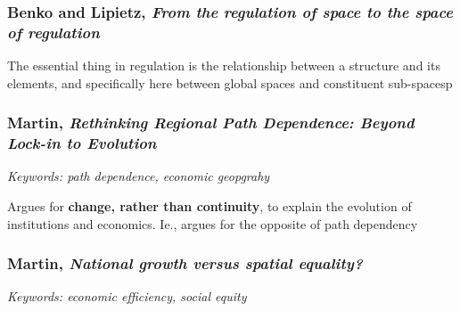 \documentclass{article}
\begin{document}
\subsubsection{Benko and Lipietz, \textit{From the regulation of space to the space of regulation}}

\begin{outline}
	\1 The essential thing in regulation is the relationship between a structure and its elements, and specifically here between global spaces and constituent sub-spacesp
\end{outline}

\subsubsection{Martin, \textit{Rethinking Regional Path Dependence: Beyond Lock-in to Evolution}}

\textit{Keywords: path dependence, economic geopgrahy}

\begin{outline}
	\1 Argues for \textbf{change, rather than continuity}, to explain the evolution of institutions and economics. Ie., argues for the opposite of path dependency
\end{outline}

\subsubsection{Martin, \textit{National growth versus spatial equality?}}

\textit{Keywords: economic efficiency, social equity}
\end{document}
